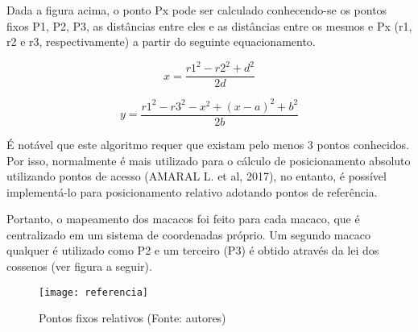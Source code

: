 Dada a figura acima, o ponto Px pode ser calculado conhecendo-se os pontos fixos P1, P2, P3, as distâncias entre eles e as distâncias entre os mesmos e Px (r1, r2 e r3, respectivamente) a partir do seguinte equacionamento.

\begin{equation}
x = \dfrac{r1^2 - r2^2 + d^2}{2d}
\end{equation}

\begin{equation}
y = \dfrac{r1^2 - r3^2 - x^2 + (x - a)^2 + b^2}{2b}
\end{equation}

É notável que este algoritmo requer que existam pelo menos 3 pontos conhecidos. Por isso, normalmente é mais utilizado para o cálculo de posicionamento absoluto utilizando pontos de acesso (AMARAL L. et al, 2017), no entanto, é possível implementá-lo para posicionamento relativo adotando pontos de referência.

Portanto, o mapeamento dos macacos foi feito para cada macaco, que é centralizado em um sistema de coordenadas próprio. Um segundo macaco qualquer é utilizado como P2 e um terceiro (P3) é obtido através da lei dos cossenos (ver figura a seguir).

\begin{figure}[ht]
  \centering
    \texttt{[image: referencia]}
  \caption{Pontos fixos relativos (Fonte: autores)}
\end{figure}
\FloatBarrier
